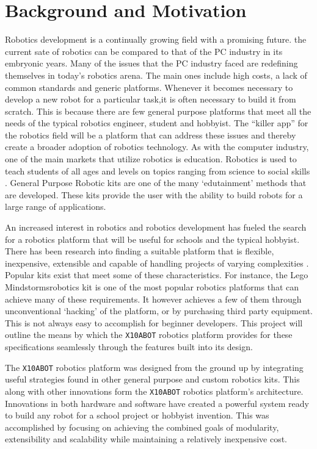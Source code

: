 \chapter{Background and Motivation} %
\label{cha:background_and_motivation}


Robotics development is a continually growing field with a promising future. the
current sate of robotics can be compared to that of the PC industry in its
embryonic years.\cite{billgates} Many of the issues that the PC industry faced are redefining
themselves in today's robotics arena. The main ones include high costs, a lack
of common standards and generic platforms. Whenever it becomes necessary to
develop a new robot for a particular task,it is often necessary to build
it from scratch. This is because there are few general purpose platforms that meet
all the needs of the typical robotics engineer, student and hobbyist\cite{citation3}. The
``killer app'' for the robotics field will be a platform that can address these issues
and thereby create a broader adoption of robotics technology. As with the
computer industry, one of the main markets that utilize robotics is education.
Robotics is used to teach students of all ages and levels on topics ranging from
science to social skills \cite{citation11}. General Purpose Robotic kits are one of the many
`edutainment' methods that are developed. These kits provide the user with the
ability to build robots for a large range of applications.

An increased interest in robotics and robotics development has fueled 
the search for a robotics platform that will be useful for schools and the 
typical hobbyist. There has been research into finding a suitable
platform that is flexible, inexpensive, extensible and capable of handling
projects of varying complexities \cite{suitable, bot-mate}. Popular kits exist that meet some of
these characteristics. For instance, the Lego Mindstorms\texttrademark  robotics
kit is one of the most popular robotics platforms that can achieve many of these
requirements. It however achieves a few of them through unconventional
`hacking' of the platform, or by purchasing third party equipment. This is not
always easy to accomplish for beginner developers. This project will outline
the means by which the \texttt{X10ABOT} robotics platform provides for these
specifications seamlessly through the features built into its design.

The \texttt{X10ABOT} robotics platform  was designed from the ground up by integrating useful strategies
found in other general purpose and custom robotics kits. This along
with other innovations form the \texttt{X10ABOT} robotics platform's
architecture. Innovations in both hardware and software have created a powerful 
system ready to build any robot for a school project or hobbyist invention.
This was accomplished by focusing on achieving the combined goals of modularity, 
extensibility and scalability while maintaining a relatively inexpensive cost.

